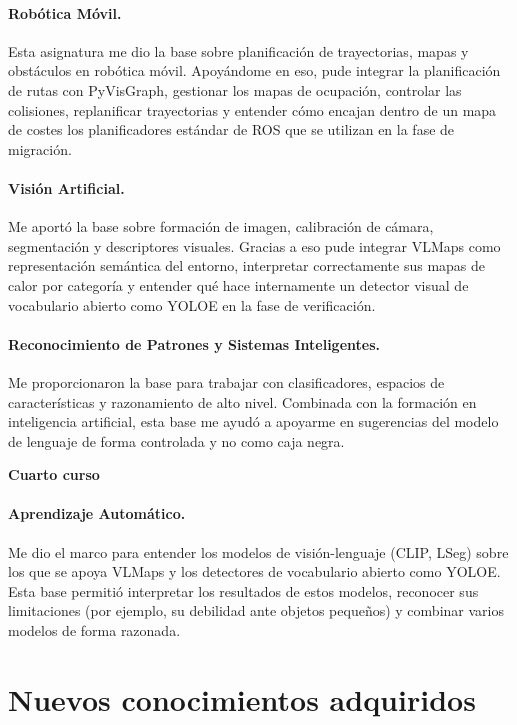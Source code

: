\documentclass[11pt,fleqn,openany]{book} %
\newcommand{\cursoTitulo}[1]{%
  \par\addvspace{14pt}%
  {\sffamily\bfseries\large\color{ocre}#1}%
  \par\vspace{1pt}%
  \noindent{\color{ocre!60}\rule{\linewidth}{0.4pt}}%
  \par\addvspace{4pt}%
}
\begin{document}
\paragraph{Robótica Móvil.} Esta asignatura me dio la base sobre planificación de trayectorias, mapas y obstáculos en robótica móvil. Apoyándome en eso, pude integrar la planificación de rutas con PyVisGraph, gestionar los mapas de ocupación, controlar las colisiones, replanificar trayectorias y entender cómo encajan dentro de un mapa de costes los planificadores estándar de ROS que se utilizan en la fase de migración.

\paragraph{Visión Artificial.} Me aportó la base sobre formación de imagen, calibración de cámara, segmentación y descriptores visuales. Gracias a eso pude integrar VLMaps como representación semántica del entorno, interpretar correctamente sus mapas de calor por categoría y entender qué hace internamente un detector visual de vocabulario abierto como YOLOE en la fase de verificación.

\paragraph{Reconocimiento de Patrones y Sistemas Inteligentes.} Me proporcionaron la base para trabajar con clasificadores, espacios de características y razonamiento de alto nivel. Combinada con la formación en inteligencia artificial, esta base me ayudó a apoyarme en sugerencias del modelo de lenguaje de forma controlada y no como caja negra.

\cursoTitulo{Cuarto curso}

\paragraph{Aprendizaje Automático.} Me dio el marco para entender los modelos de visión-lenguaje (CLIP, LSeg) sobre los que se apoya VLMaps y los detectores de vocabulario abierto como YOLOE. Esta base permitió interpretar los resultados de estos modelos, reconocer sus limitaciones (por ejemplo, su debilidad ante objetos pequeños) y combinar varios modelos de forma razonada.

\section{Nuevos conocimientos adquiridos}
\end{document}
